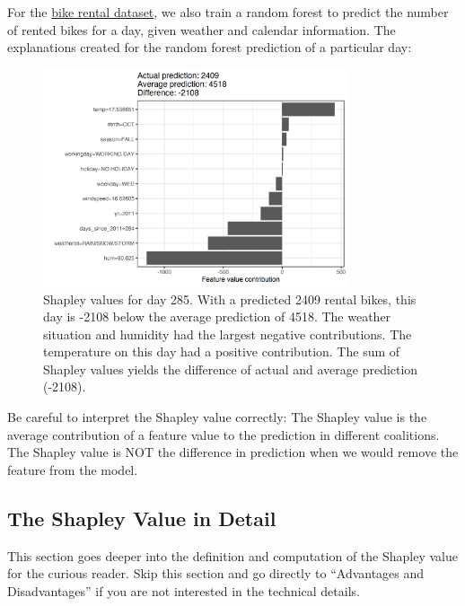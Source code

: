 \documentclass[
  10pt,
]{scrbook}
\begin{document}
For the \protect\hyperlink{bike-data}{bike rental dataset}, we also train a random forest to predict the number of rented bikes for a day, given weather and calendar information.
The explanations created for the random forest prediction of a particular day:

\begin{figure}

{\centering \includegraphics[width=0.8\textwidth]{images/shapley-bike-plot-1} 

}

\caption{Shapley values for day 285. With a predicted 2409 rental bikes, this day is -2108 below the average prediction of 4518. The weather situation and humidity had the largest negative contributions. The temperature on this day had a positive contribution. The sum of Shapley values yields the difference of actual and average prediction (-2108).}\label{fig:shapley-bike-plot}
\end{figure}

Be careful to interpret the Shapley value correctly:
The Shapley value is the average contribution of a feature value to the prediction in different coalitions.
The Shapley value is NOT the difference in prediction when we would remove the feature from the model.

\hypertarget{the-shapley-value-in-detail}{%
\subsection{The Shapley Value in Detail}\label{the-shapley-value-in-detail}}

This section goes deeper into the definition and computation of the Shapley value for the curious reader.
Skip this section and go directly to ``Advantages and Disadvantages'' if you are not interested in the technical details.
\end{document}
